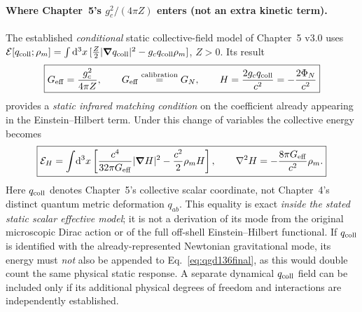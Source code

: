 \documentclass[11pt,a4paper]{article}
\newcommand{\dd}{\mathrm d}
\begin{document}
\paragraph{Where Chapter~5's $g_c^2/(4\pi Z)$ enters (not an extra kinetic term).}
The established \emph{conditional} static collective-field model of
Chapter~5 v3.0 uses $\mathcal E[q_{\rm coll};\rho_m]
=\int\dd^3x\,[\tfrac Z2|\bm\nabla q_{\rm coll}|^2-g_cq_{\rm coll}\rho_m]$,
$Z>0$. Its result
\begin{equation}\label{eq:qgd136match}
\boxed{G_{\rm eff}=\frac{g_c^2}{4\pi Z},\qquad
G_{\rm eff}\stackrel{\rm calibration}{=}G_N,\qquad
H=\frac{2g_cq_{\rm coll}}{c^2}=-\frac{2\Phi_N}{c^2}}
\end{equation}
provides a \emph{static infrared matching condition} on the coefficient
already appearing in the Einstein--Hilbert term. Under this change of
variables the collective energy becomes
\begin{equation}\label{eq:qgd136static}
\boxed{\mathcal E_H=\int\!\dd^3x\left[
\frac{c^4}{32\pi G_{\rm eff}}|\bm\nabla H|^2
-\frac{c^2}{2}\rho_mH\right],\qquad
\nabla^2H=-\frac{8\pi G_{\rm eff}}{c^2}\rho_m.}
\end{equation}
Here $q_{\rm coll}$ denotes Chapter~5's collective scalar coordinate, not Chapter~4's distinct quantum metric deformation $q_{ab}$. This equality is exact \emph{inside the stated static scalar effective
model}; it is not a derivation of its mode from the original microscopic
Dirac action or of the full off-shell Einstein--Hilbert functional.
If $q_{\rm coll}$ is identified with the already-represented Newtonian gravitational
mode, its energy must \emph{not} also be appended to
Eq.~\eqref{eq:qgd136final}, as this would double count the same physical
static response. A separate dynamical $q_{\rm coll}$ field can be included only
if its additional physical degrees of freedom and interactions are
independently established.
\end{document}
